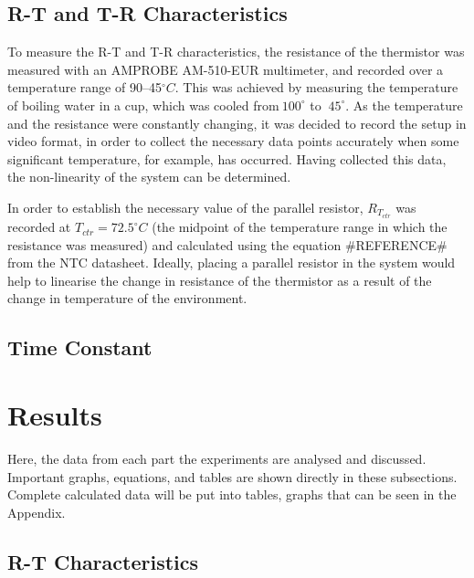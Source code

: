 \documentclass[a4,11pt]{article}
\begin{document}
\subsection{R-T and T-R Characteristics}
To measure the R-T and T-R characteristics, the resistance of the thermistor was measured with an AMPROBE AM-510-EUR multimeter, and recorded over a temperature range of 90--45$^{\circ}C$. This was achieved by measuring the temperature of boiling water in a cup, which was cooled from$~100^{\circ}$ to $~45^{\circ}$. As the temperature and the resistance were constantly changing, it was decided to record the setup in video format, in order to collect the necessary data points accurately when some significant temperature, for example, has occurred. Having collected this data, the non-linearity of the system can be determined.

In order to establish the necessary value of the parallel resistor, $R_{T_{ctr}}$ was recorded at $T_{ctr}=72.5^{\circ}C$ (the midpoint of the temperature range in which the resistance was measured) and calculated using the equation \#REFERENCE\# from the NTC datasheet. Ideally, placing a parallel resistor in the system would help to linearise the change in resistance of the thermistor as a result of the change in temperature of the environment.
\subsection{Time Constant}
\section{Results}
Here, the data from each part the experiments are analysed and discussed. Important graphs, equations, and tables are shown directly in these subsections. Complete calculated data will be put into tables, graphs that can be seen in the Appendix.
\subsection{R-T Characteristics}
\end{document}
